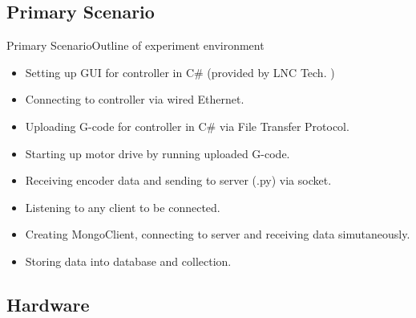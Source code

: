 \documentclass[11pt]{beamer}
\begin{document}
\subsection{Primary Scenario}
\begin{frame}{Primary Scenario}{Outline of experiment environment}
  \begin{itemize}
    \item Setting up GUI for controller in C\# (provided by LNC Tech. )
    \item Connecting to controller via wired Ethernet.
    \item Uploading G-code for controller in C\# via File Transfer Protocol.
    \item Starting up motor drive by running uploaded G-code.
    \item Receiving encoder data and sending to server (.py) via socket.
    \item Listening to any client to be connected.
    \item Creating MongoClient, connecting to server and receiving data simutaneously.
    \item  Storing data into database and collection.
  \end{itemize}
\end{frame}

\subsection{Hardware}
\end{document}
